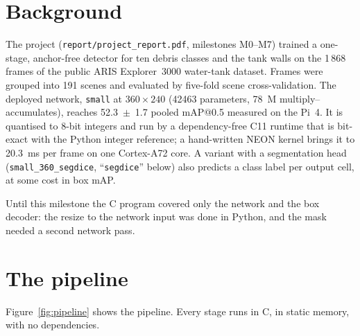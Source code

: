 \documentclass[11pt,a4paper]{article}
\newcommand{\cfg}[1]{\texttt{#1}}
\begin{document}
\section{Background}

The project (\texttt{report/project\_report.pdf}, milestones M0--M7)
trained a one-stage, anchor-free detector for ten debris classes and the
tank walls on the 1\,868 frames of the public ARIS Explorer~3000
water-tank dataset. Frames were grouped into 191 scenes and evaluated by
five-fold scene cross-validation. The deployed network, \cfg{small} at
$360 \times 240$ (\num{42463} parameters, 78~M multiply--accumulates),
reaches 52.3~$\pm$~1.7 pooled mAP@0.5 measured on the Pi~4. It is
quantised to 8-bit integers and run by a dependency-free C11 runtime that
is bit-exact with the Python integer reference; a hand-written NEON kernel
brings it to 20.3~ms per frame on one Cortex-A72 core. A variant with a
segmentation head (\cfg{small\_360\_segdice}, ``\cfg{segdice}'' below)
also predicts a class label per output cell, at some cost in box mAP.

Until this milestone the C program covered only the network and the box
decoder: the resize to the network input was done in Python, and the
mask needed a second network pass.

\section{The pipeline}
\label{sec:pipeline}

Figure~\ref{fig:pipeline} shows the pipeline. Every stage runs in C, in
static memory, with no dependencies.
\end{document}
